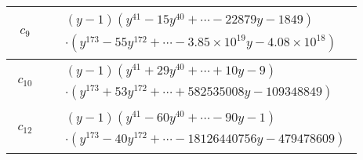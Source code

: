 \documentclass[1p]{elsarticle_modified}
\theoremstyle{definition}
\begin{document}
\begin{tabular}{m{50pt}|m{274pt}}
\hline $$\begin{aligned}c_{9}\end{aligned}$$&$\begin{aligned}
&(y-1)(y^{41}-15 y^{40}+\cdots-22879 y-1849)\\
&\cdot(y^{173}-55 y^{172}+\cdots-3.85\times10^{19} y-4.08\times10^{18})
\end{aligned}$\\
\hline $$\begin{aligned}c_{10}\end{aligned}$$&$\begin{aligned}
&(y-1)(y^{41}+29 y^{40}+\cdots+10 y-9)\\
&\cdot(y^{173}+53 y^{172}+\cdots+582535008 y-109348849)
\end{aligned}$\\
\hline $$\begin{aligned}c_{12}\end{aligned}$$&$\begin{aligned}
&(y-1)(y^{41}-60 y^{40}+\cdots-90 y-1)\\
&\cdot(y^{173}-40 y^{172}+\cdots-18126440756 y-479478609)
\end{aligned}$\\
\hline
\end{tabular}
\vskip 2pc
\end{document}
